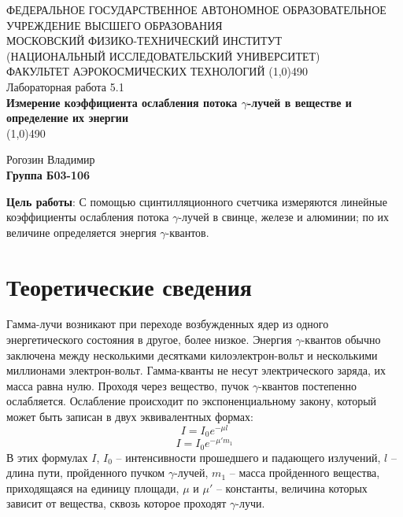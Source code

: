 \documentclass[a4paper,12pt]{article}
\begin{document}
\begin{titlepage}
\begin{center}
\large{\small ФЕДЕРАЛЬНОЕ ГОСУДАРСТВЕННОЕ АВТОНОМНОЕ ОБРАЗОВАТЕЛЬНОЕ\\ УЧРЕЖДЕНИЕ ВЫСШЕГО ОБРАЗОВАНИЯ \\ МОСКОВСКИЙ ФИЗИКО-ТЕХНИЧЕСКИЙ ИНСТИТУТ\\ (НАЦИОНАЛЬНЫЙ ИССЛЕДОВАТЕЛЬСКИЙ УНИВЕРСИТЕТ)\\ ФАКУЛЬТЕТ АЭРОКОСМИЧЕСКИХ ТЕХНОЛОГИЙ}
\vfill
\line(1,0){490}\\[1mm]
\huge{Лабораторная работа 5.1}\\
\huge\textbf{Измерение коэффициента ослабления потока $\gamma$-лучей в веществе и определение их энергии}\\
\line(1,0){490}\\[1mm]
\vfill
\begin{flushright}
\normalsize{Рогозин Владимир}\\
\normalsize{\textbf{Группа Б03-106}}\\
\end{flushright}
\end{center}
\end{titlepage}

\textbf{Цель работы}:
С помощью сцинтилляционного счетчика измеряются линейные коэффициенты ослабления потока $\gamma$-лучей в свинце, железе и алюминии; по их величине определяется энергия $\gamma$-квантов.




\section{Теоретические сведения}
Гамма-лучи возникают при переходе возбужденных ядер из одного энергетического состояния в другое, более низкое. Энергия $\gamma$-квантов обычно заключена между несколькими десятками килоэлектрон-вольт и несколькими миллионами электрон-вольт. Гамма-кванты не несут электрического заряда, их масса равна нулю. Проходя через вещество, пучок $\gamma$-квантов постепенно ослабляется. Ослабление происходит по экспоненциальному закону, который может быть записан в двух эквивалентных формах:
\begin{equation}\label{eq: Intensity dying 1}
    I = I_0e^{-\mu l}
\end{equation}
\begin{equation}\label{eq: Intensity dying 2}
    I = I_0e^{-\mu' m_1}
\end{equation}
В этих формулах $I$, $I_0$ -- интенсивности прошедшего и падающего излучений, $l$ -- длина пути, пройденного пучком $\gamma$-лучей, $m_1$ -- масса пройденного вещества, приходящаяся на единицу площади, $\mu$ и $\mu'$ -- константы, величина которых зависит от вещества, сквозь которое проходят $\gamma$-лучи.
\end{document}
